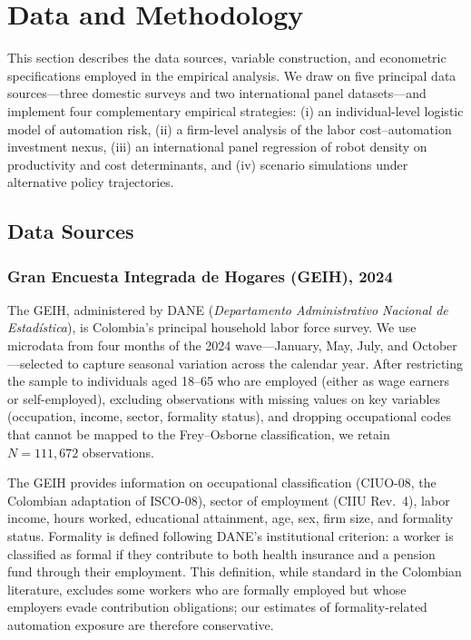 \documentclass{article}
\begin{document}
\FloatBarrier
\section{Data and Methodology}
\label{sec:data}

This section describes the data sources, variable construction, and econometric specifications employed in the empirical analysis. We draw on five principal data sources---three domestic surveys and two international panel datasets---and implement four complementary empirical strategies: (i) an individual-level logistic model of automation risk, (ii) a firm-level analysis of the labor cost--automation investment nexus, (iii) an international panel regression of robot density on productivity and cost determinants, and (iv) scenario simulations under alternative policy trajectories.

\subsection{Data Sources}
\label{subsec:data_sources}

\subsubsection*{Gran Encuesta Integrada de Hogares (GEIH), 2024}

The GEIH, administered by DANE (\textit{Departamento Administrativo Nacional de Estad\'istica}), is Colombia's principal household labor force survey. We use microdata from four months of the 2024 wave---January, May, July, and October---selected to capture seasonal variation across the calendar year. After restricting the sample to individuals aged 18--65 who are employed (either as wage earners or self-employed), excluding observations with missing values on key variables (occupation, income, sector, formality status), and dropping occupational codes that cannot be mapped to the Frey--Osborne classification, we retain $N = 111{,}672$ observations.

The GEIH provides information on occupational classification (CIUO-08, the Colombian adaptation of ISCO-08), sector of employment (CIIU Rev.\ 4), labor income, hours worked, educational attainment, age, sex, firm size, and formality status. Formality is defined following DANE's institutional criterion: a worker is classified as formal if they contribute to both health insurance and a pension fund through their employment. This definition, while standard in the Colombian literature, excludes some workers who are formally employed but whose employers evade contribution obligations; our estimates of formality-related automation exposure are therefore conservative.
\end{document}

